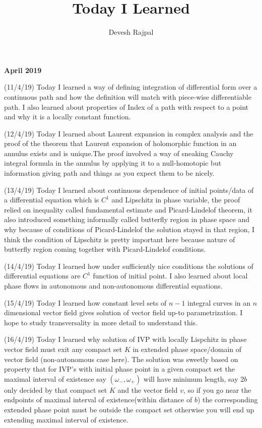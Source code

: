 \documentclass[12pt,a4paper]{article}
\title{\LARGE Today I Learned}
\author{\large Devesh Rajpal}
\date{}
\begin{document}
\maketitle
\textbf{April 2019}


(11/4/19) Today I learned a way of defining integration of differential form over a continuous path and how the definition will match with piece-wise differentiable path. I also learned about properties of Index of a path with respect to a point and why it is a locally constant function.

(12/4/19) Today I learned about Laurent expansion in complex analysis and the proof of the theorem that Laurent expansion of holomorphic function in an annulus exists and is unique.The proof involved a way of sneaking Cauchy integral formula in the annulus by applying it to a null-homotopic but information giving path and things as you expect them to be nicely.

(13/4/19) Today I learned about continuous dependence of initial points/data of a differential equation which is $C^1$ and Lipschitz in phase variable, the proof relied on inequality called fundamental estimate and Picard-Lindelof theorem, it also introduced something informally called butterfly region in phase space and why because of conditions of Picard-Lindelof the solution stayed in that region, I think the condition of Lipschitz is pretty important here because nature of butterfly region coming together with Picard-Lindelof conditions.

(14/4/19) Today I learned how under sufficiently nice conditions the solutions of differential equations are $C^1$ function of initial point. I also learned about local phase flows in autonomous and non-autonomous differential equations.

(15/4/19) Today I learned how constant level sets of $n-1$ integral curves in an $n$ dimensional vector field gives solution of vector field up-to parametrization. I hope to study transversality in more detail to understand this.

(16/4/19) Today I learned why solution of IVP with locally Lispchitz in phase vector field must exit any compact set $K$ in extended phase space/domain of vector field (non-autonomous case here). The solution was sweetly based on property that for IVP's with initial phase point in a given compact set the maximal interval of existence say $(\omega_{-},\omega_{+})$ will have minimum length, say $2b$ only decided by that compact set $K$ and the vector field $v$, so if you go near the endpoints of maximal interval of existence(within distance of $b$) the corresponding extended phase point must be outside the compact set otherwise you will end up extending maximal interval of existence.
\end{document}
